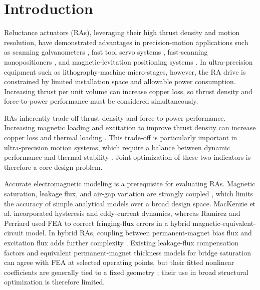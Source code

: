 \section{Introduction}
\label{sec:introduction}
Reluctance actuators (RAs), leveraging their high thrust density and motion resolution, have demonstrated advantages in precision-motion applications such as scanning galvanometers \cite{pechgraber2023resonant,pechhacker2024decreasing}, fast tool servo systems \cite{huang2022modeling}, fast-scanning nanopositioners \cite{shan2013design}, and magnetic-levitation positioning systems \cite{kim2007design}. In ultra-precision equipment such as lithography-machine micro-stages, however, the RA drive is constrained by limited installation space and allowable power consumption. Increasing thrust per unit volume can increase copper loss, so thrust density and force-to-power performance must be considered simultaneously.
\par RAs inherently trade off thrust density and force-to-power performance. Increasing magnetic loading and excitation to improve thrust density can increase copper loss and thermal loading \cite{krishnan2001srm,boldea2014electric}. This trade-off is particularly important in ultra-precision motion systems, which require a balance between dynamic performance and thermal stability \cite{trumper2003magnetically,butler2011precision}. Joint optimization of these two indicators is therefore a core design problem.
\par Accurate electromagnetic modeling is a prerequisite for evaluating RAs. Magnetic saturation, leakage flux, and air-gap variation are strongly coupled \cite{pillay2002modeling,ionel2007computation}, which limits the accuracy of simple analytical models over a broad design space. MacKenzie et al. \cite{mackenzie2015design} incorporated hysteresis and eddy-current dynamics, whereas Ramirez and Perriard \cite{ramirez2019hybrid} used FEA to correct fringing-flux errors in a hybrid magnetic-equivalent-circuit model. In hybrid RAs, coupling between permanent-magnet bias flux and excitation flux adds further complexity \cite{boldea2008synchronous}. Existing leakage-flux compensation factors \cite{alizadeh2019modeling} and equivalent permanent-magnet thickness models for bridge saturation \cite{liu2022analytical} can agree with FEA at selected operating points, but their fitted nonlinear coefficients are generally tied to a fixed geometry \cite{bolognani2011design}; their use in broad structural optimization is therefore limited.

